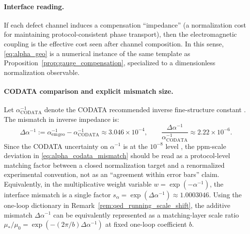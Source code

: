 \paragraph{Interface reading.}
If each defect channel induces a compensation ``impedance'' (a normalization cost for maintaining protocol-consistent phase transport), then the electromagnetic coupling is the effective cost seen after channel composition.
In this sense, \eqref{eq:alpha_geo} is a numerical instance of the same template as Proposition~\ref{prop:gauge_compensation}, specialized to a dimensionless normalization observable.

\paragraph{CODATA comparison and explicit mismatch size.}
Let $\alpha^{-1}_{\mathrm{CODATA}}$ denote the CODATA recommended inverse fine-structure constant \cite{CODATA2022RMP}.
The mismatch in inverse impedance is:
\begin{equation}\label{eq:alpha_codata_mismatch}
\Delta\alpha^{-1}:=\alpha_{\mathrm{em}}^{-1}{}_{\mathrm{geo}}-\alpha_{\mathrm{CODATA}}^{-1}\approx 3.046\times 10^{-4},
\qquad
\frac{\Delta\alpha^{-1}}{\alpha_{\mathrm{CODATA}}^{-1}}\approx 2.22\times 10^{-6}.
\end{equation}
Since the CODATA uncertainty on $\alpha^{-1}$ is at the $10^{-8}$ level \cite{CODATA2022RMP}, the ppm-scale deviation in \eqref{eq:alpha_codata_mismatch} should be read as a protocol-level matching factor between a closed normalization target and a renormalized experimental convention, not as an ``agreement within error bars'' claim.
Equivalently, in the multiplicative weight variable $w=\exp(-\alpha^{-1})$, the interface mismatch is a single factor $s_\alpha=\exp(\Delta\alpha^{-1})\approx 1.0003046$.
Using the one-loop dictionary in Remark~\ref{rem:qed_running_scale_shift}, the additive mismatch $\Delta\alpha^{-1}$ can be equivalently represented as a matching-layer scale ratio $\mu_\ast/\mu_0=\exp(-(2\pi/b)\Delta\alpha^{-1})$ at fixed one-loop coefficient $b$.

